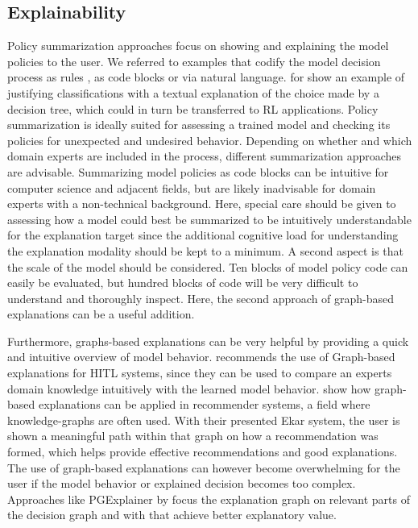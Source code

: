 \documentclass[twoside,11pt]{article}
\begin{document}
\begin{enumerate}
\subsection{Explainability}
Policy summarization approaches focus on showing and explaining the model policies to the user. We referred to examples that codify the model decision process as rules \citep{LiuEtAl:2018:LinearModelUTrees}, as code blocks \citep{VermaEtAl:2018:ProgrammaticallyInterpretableRL} or via natural language. \citet{AlonsoEtAl:2018:xAINLBeerClassifier} for show an example of justifying classifications with a textual explanation of the choice made by a decision tree, which could in turn be transferred to RL applications.
Policy summarization is ideally suited for assessing a trained model and checking its policies for unexpected and undesired behavior. Depending on whether and which domain experts are included in the process, different summarization approaches are advisable. Summarizing model policies as code blocks can be intuitive for computer science and adjacent fields, but are likely inadvisable for domain experts with a non-technical background. Here, special care should be given to assessing how a model could best be summarized to be intuitively understandable for the explanation target since the additional cognitive load for understanding the explanation modality should be kept to a minimum.
A second aspect is that the scale of the model should be considered. Ten blocks of model policy code can easily be evaluated, but hundred blocks of code will be very difficult to understand and thoroughly inspect. Here, the second approach of graph-based explanations can be a useful addition.

Furthermore, graphs-based explanations can be very helpful by providing a quick and intuitive overview of model behavior. \citet{Holzinger:2016:iML} recommends the use of Graph-based explanations for HITL systems, since they can be used to compare an experts domain knowledge intuitively with the learned model behavior. \citet{SongEtAl:2019:ExplainableGraphBasedRecommendations} show how graph-based explanations can be applied in recommender systems, a field where knowledge-graphs are often used. With their presented Ekar system, the user is shown a meaningful path within that graph on how a recommendation was formed, which helps provide effective recommendations and good explanations.
The use of graph-based explanations can however become overwhelming for the user if the model behavior or explained decision becomes too complex. Approaches like PGExplainer by \citep{Vu:2020:PGMExplainer} focus the explanation graph on relevant parts of the decision graph and with that achieve better explanatory value.


\end{enumerate}
\end{document}
